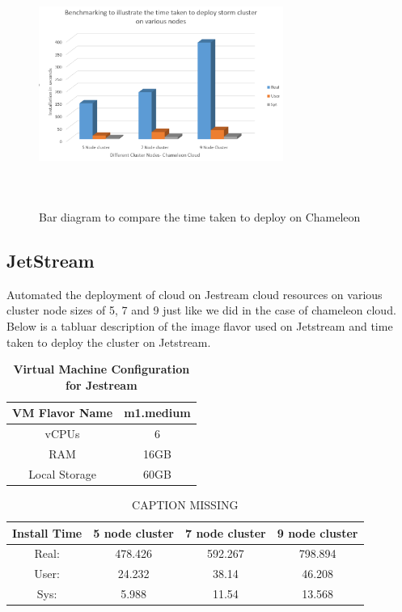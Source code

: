 \documentclass[9pt,twocolumn,twoside]{../../styles/osajnl}
\begin{document}
\begin{figure}[!htb]
  \includegraphics[width=8cm,height=8cm,keepaspectratio,width=\linewidth]{images/bar-1.png}
  \caption{Bar diagram to compare the time taken to deploy on Chameleon}
  \label{Bar diagram to compare the time taken to deploy on Chameleon}
\end{figure}

\subsection{JetStream}

Automated the deployment of cloud on Jestream cloud resources on various cluster node sizes of 5, 7 and 9 just like we did in the case of chameleon cloud. Below is a tabluar description of the image flavor used on Jetstream and time taken to deploy the cluster on Jetstream.


\begin{table}[htbp]
\centering
\caption{\bf Virtual Machine Configuration for Jestream}

 \begin{tabular} {| c | c |}

 \hline
VM Flavor Name   & m1.medium  \\
\hline
vCPUs & 6  \\
 \hline
RAM & 16GB   \\
 \hline
Local Storage & 60GB \\
\hline
\end{tabular}
  \label{tab:cloud-comparison}
\end{table}


\begin{table}[htbp]
\centering
\caption{CAPTION MISSING}\label{T:labelmissing}
 \begin{tabular}{|c|| c c c|} 
 \hline
 Install Time &  5 node cluster & 7 node cluster & 9 node cluster\\ [0.5ex]
 \hline\hline
 Real: & 478.426 & 592.267 & 798.894 \\ 
 \hline
 User: & 24.232 & 38.14 & 46.208 \\
 \hline
 Sys: & 5.988 & 11.54 & 13.568 \\
 \hline
\end{tabular}
\end{table}
\end{document}
